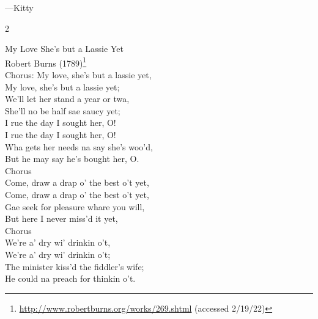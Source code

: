 \documentclass[12pt]{article}
\begin{document}
{\begin{minipage}{7.0in}
---Kitty


  \begin{multicols}{2}
    {\parindent0pt
      \raggedright
      \small
My Love She's but a Lassie Yet \\
Robert Burns (1789)\footnote{\url{http://www.robertburns.org/works/269.shtml} (accessed 2/19/22)} \\
\bigskip
Chorus: My love, she's but a lassie yet, \\
My love, she's but a lassie yet; \\
We'll let her stand a year or twa, \\
She'll no be half sae saucy yet; \\
\bigskip
I rue the day I sought her, O! \\
I rue the day I sought her, O! \\
Wha gets her needs na say she's woo'd, \\
But he may say he's bought her, O. \\
\bigskip
Chorus \\
\bigskip
Come, draw a drap o' the best o't yet, \\
Come, draw a drap o' the best o't yet, \\
Gae seek for pleasure whare you will, \\
But here I never miss'd it yet, \\
\bigskip
Chorus \\
\bigskip
We're a' dry wi' drinkin o't, \\
We're a' dry wi' drinkin o't; \\
The minister kiss'd the fiddler's wife; \\
He could na preach for thinkin o't.
    }

  \end{multicols}
    
  \end{minipage}
  \vspace*{\fill}
}
\end{document}
